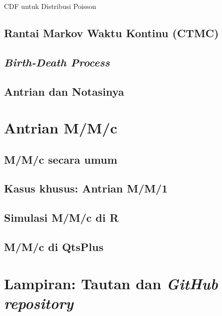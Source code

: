 \documentclass{beamer}
\begin{document}
\begin{frame}{CDF untuk Distribusi Poisson}
    
\end{frame}

\subsection{Rantai Markov Waktu Kontinu (CTMC)}

\subsection{\textit{Birth-Death Process}}

\subsection{Antrian dan Notasinya}

\section{Antrian M/M/c}

\subsection{M/M/c secara umum}

\subsection{Kasus khusus: Antrian M/M/1}

\subsection{Simulasi M/M/c di R}

\subsection{M/M/c di QtsPlus}

\section{Lampiran: Tautan dan \textit{GitHub repository}}
\end{document}
